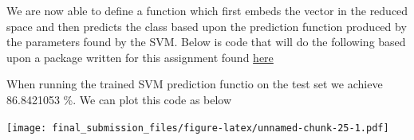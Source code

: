 \documentclass[]{article}
\newenvironment{Shaded}{\begin{snugshade}}{\end{snugshade}}
\newcommand{\KeywordTok}[1]{\textcolor[rgb]{0.13,0.29,0.53}{\textbf{#1}}}
\newcommand{\DataTypeTok}[1]{\textcolor[rgb]{0.13,0.29,0.53}{#1}}
\newcommand{\DecValTok}[1]{\textcolor[rgb]{0.00,0.00,0.81}{#1}}
\newcommand{\StringTok}[1]{\textcolor[rgb]{0.31,0.60,0.02}{#1}}
\newcommand{\ControlFlowTok}[1]{\textcolor[rgb]{0.13,0.29,0.53}{\textbf{#1}}}
\newcommand{\OperatorTok}[1]{\textcolor[rgb]{0.81,0.36,0.00}{\textbf{#1}}}
\newcommand{\NormalTok}[1]{#1}
\begin{document}
We are now able to define a function which first embeds the vector in
the reduced space and then predicts the class based upon the prediction
function produced by the parameters found by the SVM. Below is code that
will do the following based upon a package written for this assignment
found
\href{https://github.com/alessio-b-zak/sc1-svm-example-package}{here}

\begin{Shaded}
\end{Shaded}

\begin{Shaded}
\end{Shaded}

When running the trained SVM prediction functio on the test set we
achieve 86.8421053 \%. We can plot this code as below

\texttt{[image: final\_submission\_files/figure-latex/unnamed-chunk-25-1.pdf]}
\end{document}
